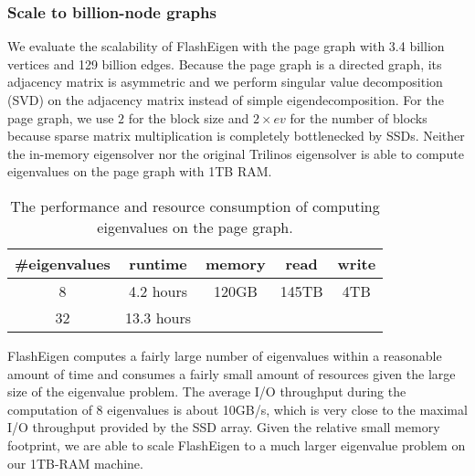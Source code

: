 
\begin{figure}
	\begin{center}
		\footnotesize
		\vspace{-15pt}
		
		\vspace{-15pt}
		\caption{}
		\label{perf:cache}
	\end{center}
\end{figure}


\subsubsection{Scale to billion-node graphs}

We evaluate the scalability of FlashEigen with the page graph with 3.4 billion
vertices and 129 billion edges. Because the page graph is a directed graph,
its adjacency matrix is asymmetric and we perform singular value decomposition
(SVD) on the adjacency matrix instead of simple eigendecomposition. For the page
graph, we use $2$ for the block size and $2 \times ev$ for the number of blocks
because sparse matrix multiplication is completely bottlenecked by SSDs.
Neither the in-memory eigensolver nor the original Trilinos eigensolver is able
to compute eigenvalues on the page graph with 1TB RAM.

\begin{table}
	\begin{center}
		\small
		\begin{tabular}{|c|c|c|c|c|}
			\hline
			\#eigenvalues & runtime & memory & read & write \\
			\hline
			8 & 4.2 hours & 120GB & 145TB & 4TB \\
			\hline
			32 & 13.3 hours &  &  & \\
			\hline
		\end{tabular}
		\normalsize
	\end{center}
	\caption{The performance and resource consumption of computing eigenvalues
	on the page graph.}
	\label{pg_ev}
\end{table}

FlashEigen computes a fairly large number of eigenvalues within a reasonable
amount of time and consumes a fairly small amount of resources given the large
size of the eigenvalue problem.
The average I/O throughput during the computation of 8 eigenvalues is about
10GB/s, which is very close to the maximal I/O throughput provided by
the SSD array.
Given the relative small memory footprint, we are able to scale FlashEigen
to a much larger eigenvalue problem on our 1TB-RAM machine.
